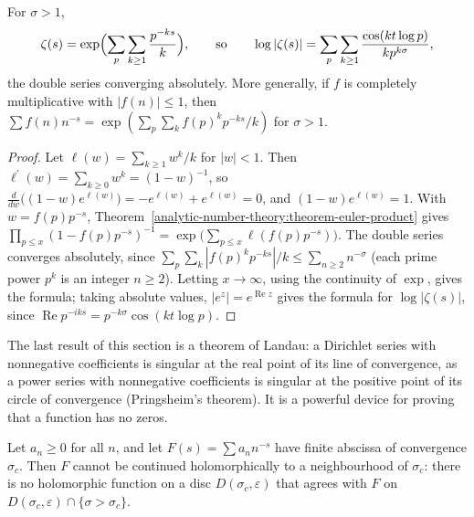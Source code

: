 \begin{proposition}\label{analytic-number-theory:proposition-log-zeta}
For $\sigma > 1$,
\[
\zeta(s) = \exp\Bigl(\sum_p\sum_{k \geq 1}\frac{p^{-ks}}{k}\Bigr), \qquad \text{so} \qquad \log|\zeta(s)| = \sum_p\sum_{k \geq 1}\frac{\cos(kt\log p)}{kp^{k\sigma}},
\]
the double series converging absolutely. More generally, if $f$ is completely multiplicative with $|f(n)| \leq 1$, then $\sum f(n)n^{-s} = \exp(\sum_p\sum_kf(p)^kp^{-ks}/k)$ for $\sigma > 1$.
\end{proposition}

\begin{proof}
Let $\ell(w) = \sum_{k \geq 1}w^k/k$ for $|w| < 1$. Then $\ell^{\prime}(w) = \sum_{k \geq 0}w^k = (1 - w)^{-1}$, so $\frac{d}{dw}\bigl((1 - w)e^{\ell(w)}\bigr) = -e^{\ell(w)} + e^{\ell(w)} = 0$, and
$(1 - w)e^{\ell(w)} = 1$. With $w = f(p)p^{-s}$, Theorem~\ref{analytic-number-theory:theorem-euler-product} gives $\prod_{p \leq x}(1 - f(p)p^{-s})^{-1} = \exp\bigl(\sum_{p \leq x}\ell(f(p)p^{-s})\bigr)$.
The double series converges absolutely, since $\sum_p\sum_k|f(p)^kp^{-ks}|/k \leq \sum_{n \geq 2}n^{-\sigma}$ (each prime power $p^k$ is an integer $n \geq 2$). Letting $x \to \infty$, using the
continuity of $\exp$, gives the formula; taking absolute values, $|e^z| = e^{\operatorname{Re}z}$ gives the formula for $\log|\zeta(s)|$, since $\operatorname{Re}p^{-iks} = p^{-k\sigma}\cos(kt\log p)$.
\end{proof}

The last result of this section is a theorem of Landau: a Dirichlet series with nonnegative coefficients is singular at the real point of its line of convergence, as a power series with nonnegative
coefficients is singular at the positive point of its circle of convergence (Pringsheim's theorem). It is a powerful device for proving that a function has no zeros.

\begin{theorem}[Landau]\label{analytic-number-theory:theorem-landau}
Let $a_n \geq 0$ for all $n$, and let $F(s) = \sum a_nn^{-s}$ have finite abscissa of convergence $\sigma_c$. Then $F$ cannot be continued holomorphically to a neighbourhood of $\sigma_c$: there is no
holomorphic function on a disc $D(\sigma_c, \varepsilon)$ that agrees with $F$ on $D(\sigma_c, \varepsilon) \cap \{\sigma > \sigma_c\}$.
\end{theorem}

